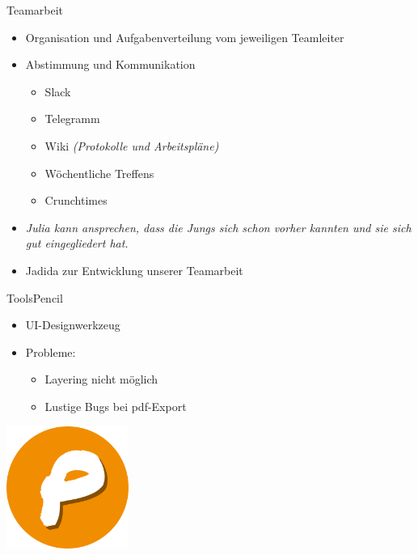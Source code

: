 \documentclass[10pt]{beamer}
\begin{document}
\begin{frame}{Teamarbeit}{}
	\begin{itemize}
		\item Organisation und Aufgabenverteilung vom jeweiligen Teamleiter
		\item Abstimmung und Kommunikation
		\begin{itemize}
			\item Slack
			\item Telegramm
			\item Wiki \textit{(Protokolle und Arbeitspläne)}
			\pause
			\item Wöchentliche Treffens
			\item Crunchtimes
		\end{itemize}
		\pause
		\item \textit{Julia kann ansprechen, dass die Jungs sich schon vorher kannten und sie sich gut eingegliedert hat.}
		\item Jadida zur Entwicklung unserer Teamarbeit
	\end{itemize}
\end{frame}


\begin{frame}{Tools}{Pencil}
	\begin{itemize}
		\item UI-Designwerkzeug
		\item Probleme:
			\begin{itemize}
				\item Layering nicht möglich
				\item Lustige Bugs bei pdf-Export
			\end{itemize} 
	\end{itemize}
	\vspace{2cm}
    \hfill\includegraphics[width = 0.3\textwidth]{img/pencil}
\end{frame}
\end{document}
